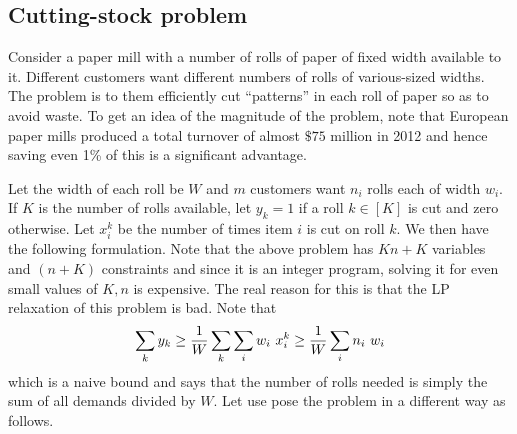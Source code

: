 \documentclass[letterpaper, 10pt, twocolumn, reqno]{amsart}
\begin{document}
\subsection{Cutting-stock problem}
\label{ssec:col_gen_cutting_stock}

Consider a paper mill with a number of rolls of paper of fixed width available to it. Different customers want different numbers of rolls of various-sized widths. The problem is to them efficiently cut ``patterns'' in each roll of paper so as to avoid waste. To get an idea of the magnitude of the problem, note that European paper mills produced a total turnover of almost $\$ 75$ million in 2012 and hence saving even 1\% of this is a significant advantage.

Let the width of each roll be $W$ and $m$ customers want $n_i$ rolls each of width $w_i$. If $K$ is the number of rolls available, let $y_k = 1$ if a roll $k \in [K]$ is cut and zero otherwise. Let $x_i^k$ be the number of times item $i$ is cut on roll $k$. We then have the following formulation.
Note that the above problem has $Kn + K$ variables and $(n+K)$ constraints and since it is an integer program, solving it for even small values of $K, n$ is expensive. The real reason for this is that the LP relaxation of this problem is bad. Note that
$$
\sum_k y_k \geq \frac{1}{W} \sum_k \sum_i w_i\ x_i^k \geq \frac{1}{W} \sum_i n_i\ w_i
$$
which is a naive bound and says that the number of rolls needed is simply the sum of all demands divided by $W$. Let use pose the problem in a different way as follows.
\end{document}
